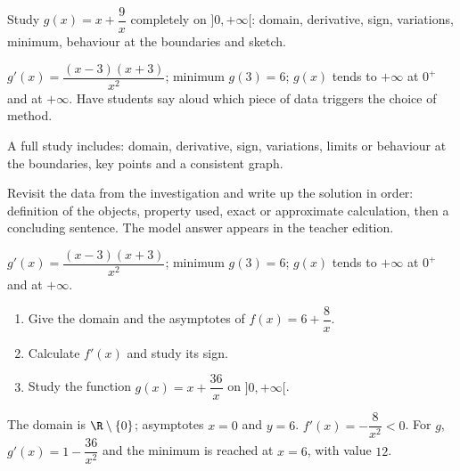 \begin{activity}
Study $g(x)=x+\dfrac9x$ completely on $]0,+\infty[$: domain, derivative, sign, variations, minimum, behaviour at the boundaries and sketch.
\begin{center}\end{center}
\end{activity}
\begin{solution}$g'(x)=\dfrac{(x-3)(x+3)}{x^2}$; minimum $g(3)=6$; $g(x)$ tends to $+\infty$ at $0^+$ and at $+\infty$. Have students say aloud which piece of data triggers the choice of method.\end{solution}

\begin{summary}A full study includes: domain, derivative, sign, variations, limits or behaviour at the boundaries, key points and a consistent graph.\end{summary}

\begin{example}
Revisit the data from the investigation and write up the solution in order: definition of the objects, property used, exact or approximate calculation, then a concluding sentence. The model answer appears in the teacher edition.
\end{example}
\begin{solution}$g'(x)=\dfrac{(x-3)(x+3)}{x^2}$; minimum $g(3)=6$; $g(x)$ tends to $+\infty$ at $0^+$ and at $+\infty$.\end{solution}

\begin{exercise}[essential]
\begin{enumerate}\item Give the domain and the asymptotes of $f(x)=6+\dfrac{8}x$.\item Calculate $f'(x)$ and study its sign.\item Study the function $g(x)=x+\dfrac{36}x$ on $]0,+\infty[$.\end{enumerate}
\end{exercise}
\begin{solution}The domain is $\R\setminus\{0\}$; asymptotes $x=0$ and $y=6$. $f'(x)=-\dfrac{8}{x^2}<0$. For $g$, $g'(x)=1-\dfrac{36}{x^2}$ and the minimum is reached at $x=6$, with value $12$.\end{solution}

